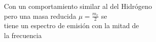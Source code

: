 \documentclass[preview]{standalone}
\begin{document}
\begin{center}
\begin{flushleft}
                      Con un comportamiento similar al del Hidrógeno\\
                      pero una masa reducida $\mu = \frac{m_e}{2}$ se \\
                      tiene un espectro de emisión con la mitad de \\
                      la frecuencia
                      \end{flushleft}
\end{center}
\end{document}

